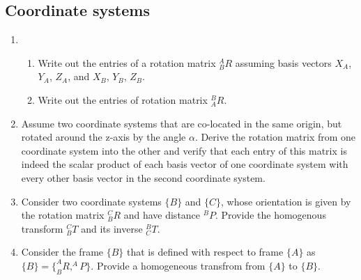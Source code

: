 \subsection*{Coordinate systems}
\begin{enumerate}
\item 
\begin{enumerate}
 \item Write out the entries of a rotation matrix $^A_BR$ assuming basis vectors $X_A$, $Y_A$, $Z_A$, and $X_B$, $Y_B$, $Z_B$. 
 \item Write out the entries of rotation matrix $^B_AR$.
 \end{enumerate} 
\item Assume two coordinate systems that are co-located in the same origin, but rotated around the z-axis by the angle $\alpha$. Derive the rotation matrix from one coordinate system into the other and verify that each entry of this matrix is indeed the scalar product of each basis vector of one coordinate system with every other basis vector in the second coordinate system.  
\item Consider two coordinate systems $\{B\}$ and $\{C\}$, whose orientation is given by the rotation matrix $^C_BR$ and have distance $^BP$. Provide the homogenous transform $^C_BT$ and its inverse $^B_CT$. 
\item Consider the frame $\{B\}$ that is defined with respect to frame $\{A\}$ as $\{B\}=\{^A_BR, ^AP\}$. Provide a homogeneous transfrom from $\{A\}$ to $\{B\}$.
\end{enumerate}

